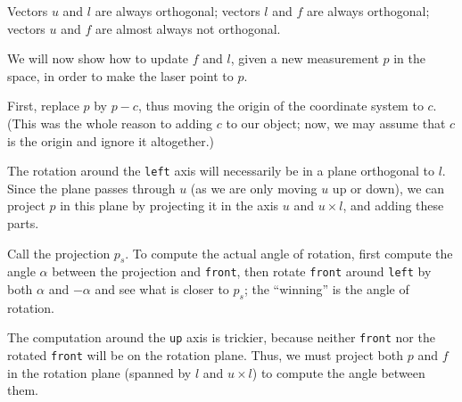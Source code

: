 \documentclass{article}
\begin{document}
Vectors $u$ and $l$ are always orthogonal;
vectors $l$ and $f$ are always orthogonal;
vectors $u$ and $f$ are almost always not orthogonal.

We will now show how to update $f$ and $l$,
given a new measurement $p$ in the space,
in order to make the laser point to $p$.

First, replace $p$ by $p - c$,
thus moving the origin of the coordinate system to $c$.
(This was the whole reason to adding $c$ to our object;
now, we may assume that $c$ is the origin and ignore it altogether.)

The rotation around the \texttt{left} axis
will necessarily be in a plane orthogonal to $l$.
Since the plane passes through $u$
(as we are only moving $u$ up or down),
we can project $p$ in this plane
by projecting it in the axis $u$ and $u \times l$,
and adding these parts.

Call the projection $p_s$.
To compute the actual angle of rotation,
first compute the angle $\alpha$ between the projection and \texttt{front},
then rotate \texttt{front} around \texttt{left} by both $\alpha$ and $-\alpha$
and see what is closer to $p_s$;
the ``winning'' is the angle of rotation.

The computation around the \texttt{up} axis is trickier,
because neither \texttt{front} nor the rotated \texttt{front}
will be on the rotation plane.
Thus, we must project both $p$ and $f$ in the rotation plane
(spanned by $l$ and $u \times l$)
to compute the angle between them.
\end{document}
